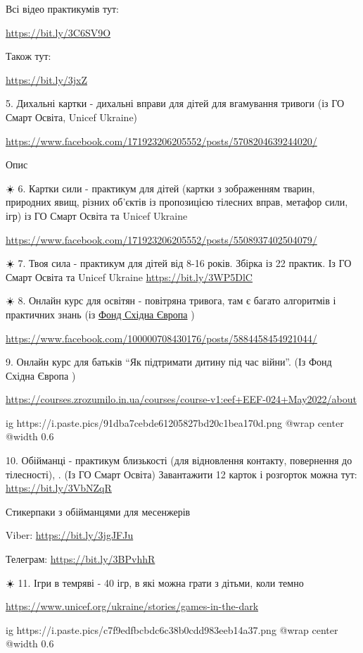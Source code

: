 Всі відео практикумів тут:

\url{https://bit.ly/3C6SV9O}

Також тут:

\url{https://bit.ly/3jxZ}

5. Дихальні картки - дихальні вправи для дітей для вгамування тривоги (із ГО
Смарт Освіта, Unicef Ukraine)

\url{https://www.facebook.com/171923206205552/posts/5708204639244020/}

Опис 

☀️ 6. Картки сили - практикум для дітей (картки з зображенням тварин, природних
явищ, різних об'єктів із пропозицією тілесних вправ, метафор сили, ігр) із ГО
Смарт Освіта та Unicef Ukraine

\url{https://www.facebook.com/171923206205552/posts/5508937402504079/}

☀️ 7. Твоя сила - практикум для дітей від 8-16 років. Збірка із 22 практик. Із
ГО Смарт Освіта та Unicef Ukraine \url{https://bit.ly/3WP5DlC}

☀️ 8.  Онлайн курс для освітян - повітряна тривога, там є багато алгоритмів і
практичних знань (із \href{https://www.facebook.com/eef.org.ua}{Фонд Східна Європа} )

\url{https://www.facebook.com/100000708430176/posts/5884458454921044/}

9. Онлайн курс для батьків \enquote{Як підтримати дитину під час війни}. (Із Фонд Східна Європа )

\url{https://courses.zrozumilo.in.ua/courses/course-v1:eef+EEF-024+May2022/about}

\ifcmt
  ig https://i.paste.pics/91dba7cebde61205827bd20c1bea170d.png
  @wrap center
  @width 0.6
\fi

10. Обійманці - практикум близькості (для відновлення контакту, повернення до
тілесності), . (Із ГО Смарт Освіта) Завантажити 12 карток і розгорток можна
тут: \url{https://bit.ly/3VbNZqR}

Стикерпаки з обійманцями для месенжерів

Viber: \url{https://bit.ly/3jgJFJu} 

Телеграм: \url{https://bit.ly/3BPvhhR}

☀️ 11. Ігри в темряві - 40 ігр, в які можна грати з дітьми, коли темно

\url{https://www.unicef.org/ukraine/stories/games-in-the-dark}

\ifcmt
  ig https://i.paste.pics/c7f9edfbcbdc6c38b0cdd983eeb14a37.png
  @wrap center
  @width 0.6
\fi
